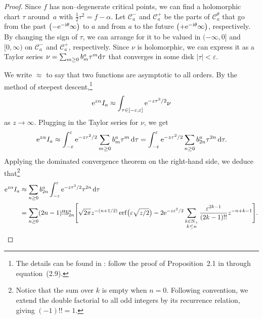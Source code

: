 \documentclass[10pt,a4paper]{amsart}
\numberwithin{equation}{section}
\begin{document}
\begin{proof}
Since $f$ has non--degenerate critical points, we can find a holomorphic chart $\tau$ around~$a$ with $\frac{1}{2} \tau^2 = f - \alpha$. Let $\mathcal{C}^-_a$ and $\mathcal{C}^+_a$ be the parts of $\mathcal{C}_a^\theta$ that go from the past $\bigl(-{\rm e}^{-{\rm i}\theta}\infty\bigr)$ to $a$ and from $a$ to the future $\bigl(+{\rm e}^{-{\rm i}\theta}\infty\bigr)$, respectively. By changing the sign of $\tau$, we can arrange for it to be valued in $(-\infty, 0]$ and $[0,\infty)$ on $\mathcal{C}^-_a$ and $\mathcal{C}^+_a$, respectively. Since $\nu$ is holomorphic, we can express it as a Taylor series
$\nu = \sum_{m \ge 0} b_m^a \tau^m{\rm d}\tau$
that converges in some disk $|\tau| < \varepsilon$.

We write $\approx$ to say that two functions are asymptotic to all orders. By the method of steepest descent,\footnote{The details can be found in \cite{miller2006applied}: follow the proof of Proposition~2.1 in through equation~(2.9).}
\[ {\rm e}^{z \alpha} I_a \approx \int_{\tau \in [-\varepsilon, \varepsilon]} {\rm e}^{-z\tau^2/2} \nu \]
as $z \to \infty$. Plugging in the Taylor series for $\nu$, we get
\begin{equation*}
{\rm e}^{z \alpha} I_a \approx \int_{-\varepsilon}^\varepsilon {\rm e}^{-z\tau^2/2} \sum_{m \ge 0} b_m^a \tau^m \,{\rm d}\tau = \int_{-\varepsilon}^\varepsilon {\rm e}^{-z\tau^2/2} \sum_{n \ge 0} b_{2n}^a \tau^{2n}\, {\rm d}\tau.
\end{equation*}
Applying the dominated convergence theorem on the right-hand side, we deduce that\footnote{Notice that the sum over $k$ is empty when $n = 0$. Following convention, we extend the double factorial to all odd integers by its recurrence relation, giving $(-1)!! = 1$.}
\begin{align*}
{\rm e}^{z \alpha} I_a & \approx \sum_{n \ge 0} b_{2n}^a \int_{-\varepsilon}^\varepsilon {\rm e}^{-z\tau^2/2} \tau^{2n} \,{\rm d}\tau \\
& = \sum_{n \ge 0} (2n-1)!! b_{2n}^a \Bigg[ \sqrt{2\pi} z^{-(n+1/2)} \operatorname{erf}\bigl(\varepsilon \sqrt{z/2}\bigr) - 2{\rm e}^{-z\varepsilon^2/2} \sum_{\substack{k \in \mathbb{N}_+ \\ k \le n}} \frac{\varepsilon^{2k-1}}{(2k-1)!!} z^{-n+k-1} \Bigg].
\end{align*}


\end{proof}
\end{document}
